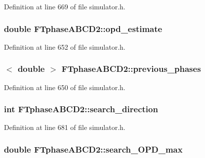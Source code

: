 Definition at line 669 of file simulator.h.

\hypertarget{classFTphaseABCD2_a08ffa3c73f7022c226d4fbd2ab7b4600}{
\subsubsection[{opd\_\-estimate}]{\setlength{\rightskip}{0pt plus 5cm}double {\bf FTphaseABCD2::opd\_\-estimate}}}
\label{classFTphaseABCD2_a08ffa3c73f7022c226d4fbd2ab7b4600}


Definition at line 652 of file simulator.h.

\hypertarget{classFTphaseABCD2_a5fd5f8a484be9eaec4967cc4ec51cf7e}{
\subsubsection[{previous\_\-phases}]{$<$ double $>$ {\bf FTphaseABCD2::previous\_\-phases}}}
\label{classFTphaseABCD2_a5fd5f8a484be9eaec4967cc4ec51cf7e}


Definition at line 650 of file simulator.h.

\hypertarget{classFTphaseABCD2_a2cc2eec336fb3974fff627edc2bf4770}{
\subsubsection[{search\_\-direction}]{\setlength{\rightskip}{0pt plus 5cm}int {\bf FTphaseABCD2::search\_\-direction}}}
\label{classFTphaseABCD2_a2cc2eec336fb3974fff627edc2bf4770}


Definition at line 681 of file simulator.h.

\hypertarget{classFTphaseABCD2_aeddbc5533ee6d080a398357eb667c86a}{
\subsubsection[{search\_\-OPD\_\-max}]{\setlength{\rightskip}{0pt plus 5cm}double {\bf FTphaseABCD2::search\_\-OPD\_\-max}}}
\label{classFTphaseABCD2_aeddbc5533ee6d080a398357eb667c86a}


